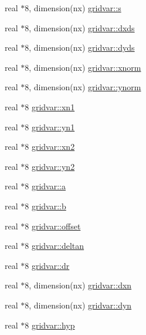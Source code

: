 \begin{DoxyCompactItemize}
\item 
real $\ast$8, dimension(nx) \hyperlink{namespacegridvar_a8501e472d9155bb35061c43281ef6ba5}{gridvar\+::s}
\item 
real $\ast$8, dimension(nx) \hyperlink{namespacegridvar_a4e7a599ab9b156f0b92fcae94441b1df}{gridvar\+::dxds}
\item 
real $\ast$8, dimension(nx) \hyperlink{namespacegridvar_ab83e7e8b7f1369a60b1ae1877ebd02b2}{gridvar\+::dyds}
\item 
real $\ast$8, dimension(nx) \hyperlink{namespacegridvar_a0982bf7134515b2e97db0842a978bdcb}{gridvar\+::xnorm}
\item 
real $\ast$8, dimension(nx) \hyperlink{namespacegridvar_ac91a158f48b7fda45b049e434e3c1147}{gridvar\+::ynorm}
\item 
real $\ast$8 \hyperlink{namespacegridvar_a314572d3cf48c6611fe18f0c35f14aa2}{gridvar\+::xn1}
\item 
real $\ast$8 \hyperlink{namespacegridvar_aae5cbf9885ae6ff5abebd0b9768a574d}{gridvar\+::yn1}
\item 
real $\ast$8 \hyperlink{namespacegridvar_a62f11262a634086d3483618aff305ad6}{gridvar\+::xn2}
\item 
real $\ast$8 \hyperlink{namespacegridvar_adfe4b86cb9e6418fe49ea8441e612530}{gridvar\+::yn2}
\item 
real $\ast$8 \hyperlink{namespacegridvar_a44d97aa52c240db97de12d4e36c6b5c5}{gridvar\+::a}
\item 
real $\ast$8 \hyperlink{namespacegridvar_a88f13d276e07180f43279156c26a1c41}{gridvar\+::b}
\item 
real $\ast$8 \hyperlink{namespacegridvar_a7fe3c8c80f1312a7f4236d8673422436}{gridvar\+::offset}
\item 
real $\ast$8 \hyperlink{namespacegridvar_aa3ec4b56c55b261b07d99a0087d8e431}{gridvar\+::deltan}
\item 
real $\ast$8 \hyperlink{namespacegridvar_aca6bbeece732654bf9a01b443eabf0ad}{gridvar\+::dr}
\item 
real $\ast$8, dimension(nx) \hyperlink{namespacegridvar_a1ce05db2c1a334cd361b4c8f96df509d}{gridvar\+::dxn}
\item 
real $\ast$8, dimension(nx) \hyperlink{namespacegridvar_ad38d62b5127d5c104db8eb449c05a2f2}{gridvar\+::dyn}
\item 
real $\ast$8 \hyperlink{namespacegridvar_a549d685a2b1afd1a9cd81342258cead5}{gridvar\+::hyp}
\end{DoxyCompactItemize}
